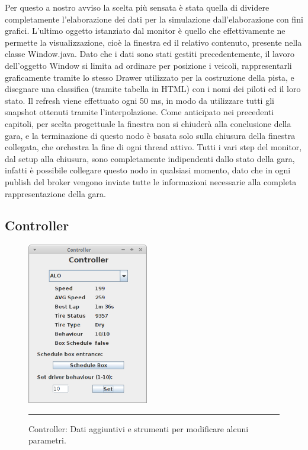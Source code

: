Per questo a nostro avviso la scelta più sensata è stata quella di dividere completamente l’elaborazione dei dati per la simulazione dall’elaborazione con fini grafici.
L’ultimo oggetto istanziato dal monitor è quello che effettivamente ne permette la visualizzazione, cioè la finestra ed il relativo contenuto, presente nella classe Window.java.
Dato che i dati sono stati gestiti precedentemente, il lavoro dell’oggetto Window si limita ad ordinare per posizione i veicoli, rappresentarli graficamente tramite lo stesso Drawer utilizzato per la costruzione della pista, e disegnare una classifica (tramite tabella in HTML) con i nomi dei piloti ed il loro stato. Il refresh viene effettuato ogni 50 ms, in modo da utilizzare tutti gli snapshot ottenuti tramite l’interpolazione.
Come anticipato nei precedenti capitoli, per scelta progettuale la finestra non si chiuderà alla conclusione della gara, e la terminazione di questo nodo è basata solo sulla chiusura della finestra collegata, che orchestra la fine di ogni thread attivo.
Tutti i vari step del monitor, dal setup alla chiusura, sono completamente indipendenti dallo stato della gara, infatti è possibile collegare questo nodo in qualsiasi momento, dato che in ogni publish del broker vengono inviate tutte le informazioni necessarie alla completa rappresentazione della gara.

\subsection{Controller}

\begin{figure}[htbp]
	\centering
		\includegraphics[keepaspectratio = true, width = 200px] {Pictures/controller}
		\rule{35em}{0.5pt}
	\caption[Controller]{Controller: Dati aggiuntivi e strumenti per modificare alcuni parametri.}
	\label{fig:Controller}
\end{figure}

